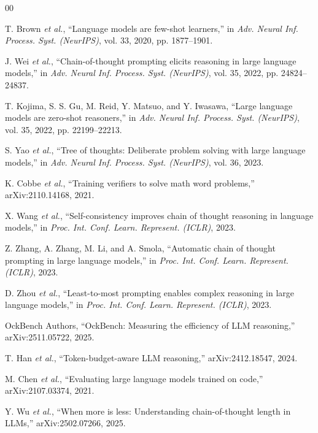\documentclass[conference]{IEEEtran}
\begin{document}
\begingroup
\small
\begin{thebibliography}{00}

T. Brown \textit{et al.}, ``Language models are few-shot learners,'' in
\textit{Adv. Neural Inf. Process. Syst. (NeurIPS)}, vol. 33, 2020,
pp. 1877--1901.

J. Wei \textit{et al.}, ``Chain-of-thought prompting elicits reasoning
in large language models,'' in \textit{Adv. Neural Inf. Process. Syst.
(NeurIPS)}, vol. 35, 2022, pp. 24824--24837.

T. Kojima, S. S. Gu, M. Reid, Y. Matsuo, and Y. Iwasawa, ``Large
language models are zero-shot reasoners,'' in \textit{Adv. Neural Inf.
Process. Syst. (NeurIPS)}, vol. 35, 2022, pp. 22199--22213.

S. Yao \textit{et al.}, ``Tree of thoughts: Deliberate problem solving
with large language models,'' in \textit{Adv. Neural Inf. Process. Syst.
(NeurIPS)}, vol. 36, 2023.

K. Cobbe \textit{et al.}, ``Training verifiers to solve math word
problems,'' arXiv:2110.14168, 2021.

X. Wang \textit{et al.}, ``Self-consistency improves chain of thought
reasoning in language models,'' in \textit{Proc. Int. Conf. Learn.
Represent. (ICLR)}, 2023.

Z. Zhang, A. Zhang, M. Li, and A. Smola, ``Automatic chain of thought
prompting in large language models,'' in \textit{Proc. Int. Conf. Learn.
Represent. (ICLR)}, 2023.

D. Zhou \textit{et al.}, ``Least-to-most prompting enables complex
reasoning in large language models,'' in \textit{Proc. Int. Conf. Learn.
Represent. (ICLR)}, 2023.

OckBench Authors, ``OckBench: Measuring the efficiency of LLM
reasoning,'' arXiv:2511.05722, 2025.

T. Han \textit{et al.}, ``Token-budget-aware LLM reasoning,''
arXiv:2412.18547, 2024.

M. Chen \textit{et al.}, ``Evaluating large language models trained on
code,'' arXiv:2107.03374, 2021.

Y. Wu \textit{et al.}, ``When more is less: Understanding
chain-of-thought length in LLMs,'' arXiv:2502.07266, 2025.


\end{thebibliography}
\end{document}
